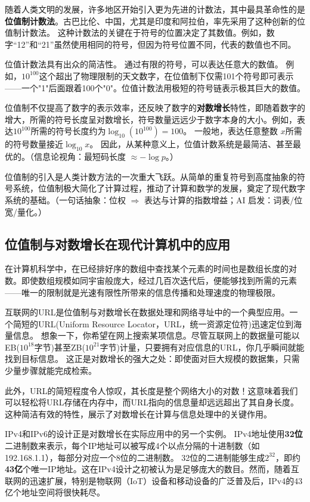 随着人类文明的发展，许多地区开始引入更为先进的计数法，其中最具革命性的是{\bf 位值制计数法}。古巴比伦、中国，尤其是印度和阿拉伯，率先采用了这种创新的位值制计数法。
这种计数法的关键在于符号的位置决定了其数值。例如，数字“12”和“21”虽然使用相同的符号，但因为符号位置不同，代表的数值也不同。

位值计数法具有出众的简洁性。
通过有限的符号，可以表达任意大的数值。
例如，$10^{100}$这个超出了物理限制的天文数字，在位值制下仅需101个符号即可表示——一个"1"后面跟着100个"0"。位值计数法用极短的符号链表示极其巨大的数值。

位值制不仅提高了数字的表示效率，还反映了数字的{\bf 对数增长}特性，即随着数字的增大，所需的符号长度呈对数增长，符号数量远远少于数字本身的大小。例如，表达$10^{100}$所需的符号长度约为$\log_{10}(10^{100})=100$。
一般地，表达任意整数 $x$所需的符号数量接近${\log_{10} x}$。
因此，从某种意义上，位值计数系统是最简洁、甚至最优的。{（信息论视角：最短码长度 $\approx -\log p$。）}

位值制的引入是人类计数方法的一次重大飞跃。从简单的重复符号到高度抽象的符号系统，位值制极大简化了计算过程，推动了计算和数学的发展，奠定了现代数字系统的基础。{（一句话抽象：位权 $\Rightarrow$ 表达与计算的指数增益；AI 启发：词表/位宽/量化。）}

\subsection{位值制与对数增长在现代计算机中的应用}
在计算机科学中，在已经排好序的数组中查找某个元素的时间也是数组长度的对数。即使数组规模如同宇宙般庞大，经过几百次迭代后，便能够找到所需的元素——唯一的限制就是光速有限性所带来的信息传播和处理速度的物理极限。

互联网的URL是位值制与对数增长在数据处理和网络寻址中的一个典型应用。一个简短的URL(Uniform Resource Locator，URL，统一资源定位符)迅速定位到海量信息。
想象一下，你希望在网上搜索某项信息。尽管互联网上的数据量可能以EB($10^{18}$字节)甚至ZB($10^{21}$字节)计量，只要拥有对应信息的URL，你几乎瞬间就能找到目标信息。
这正是对数增长的强大之处：即使面对巨大规模的数据集，只需少量步骤就能完成检索。

此外，URL的简短程度令人惊叹，其长度是整个网络大小的对数！这意味着我们可以轻松将URL存储在内存中，而URL指向的信息量却远远超出了其自身长度。
这种简洁有效的特性，展示了对数增长在计算与信息处理中的关键作用。

IPv4和IPv6的设计正是对数增长在实际应用中的另一个实例。
 IPv4地址使用{\bf 32位}二进制数来表示，每个IP地址可以被写成4个以点分隔的十进制数（如192.168.1.1），每部分对应一个8位的二进制数。
32位的二进制能够生成$2^{32}$，即约{\bf 43亿}个唯一IP地址。这在IPv4设计之初被认为是足够庞大的数目。然而，随着互联网的迅速扩展，特别是物联网（IoT）设备和移动设备的广泛普及后，IPv4的43亿个地址空间将很快耗尽。

